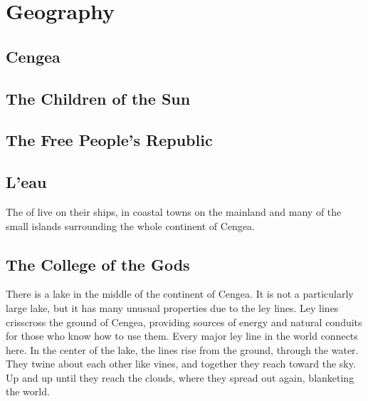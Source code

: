 \documentclass[blue]{GL2020}
\begin{document}

\section*{Geography}
\subsection*{Cengea}
\subsection*{The Children of the Sun}
\subsection*{The Free People's Republic}
\subsection*{L'eau}
The \pShippies{} of \pShip{} live on their ships, in coastal towns on the mainland and many of the small islands surrounding the whole continent of Cengea.
\subsection*{The College of the Gods}
There is a lake in the middle of the continent of Cengea. It is not a particularly large lake, but it has many unusual properties due to the ley lines. Ley lines crisscross the ground of Cengea, providing sources of energy and natural conduits for those who know how to use them. Every major ley line in the world connects here. In the center of the lake, the lines rise from the ground, through the water. They twine about each other like vines, and together they reach toward the sky. Up and up until they reach the clouds, where they spread out again, blanketing the world.
\end{document}
